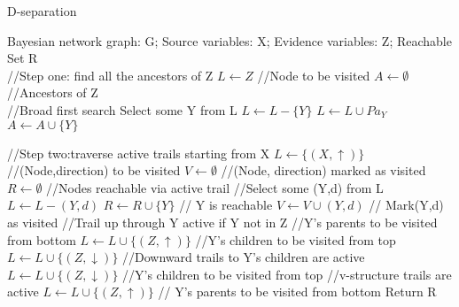 \documentclass[twoside]{article}
\begin{document}
\begin{algorithm}  
        \caption{D-separation}  
        \begin{algorithmic}[1]  
            \Require Bayesian network graph: G;  
            		 Source variables: X;   
            		 Evidence variables: Z; 
            \Ensure Reachable Set R  \\
            //Step one: find all the ancestors of Z
            \State $L \gets Z$  //Node to be visited
            \State $A \gets \emptyset$  //Ancestors of Z  \\
            //Broad first search
            	\State Select some Y from L
            	\State $L\gets L-\{Y\}$
            	 	\State $L\gets L \cup Pa_Y$
            	\EndIf
            	\State $A\gets A\cup \{Y\}$
            \EndWhile
            
            //Step two:traverse active trails starting from X
            \State $L\gets \{(X, \uparrow )\}$ //(Node,direction) to be visited
            \State $V\gets \emptyset$ //(Node, direction) marked as visited
            \State $R\gets \emptyset$ //Nodes reachable via active trail
            \While
            	//Select some (Y,d) from L
            	\State $L\gets L-{(Y,d)}$
            			\State $R\gets R\cup \{Y\}$ // Y is reachable
            		\EndIf
            		\State $V\gets V\cup {(Y,d)}$  // Mark(Y,d) as visited
            		 //Trail up through Y active if Y not in Z
            			//Y's parents to be visited from bottom
            			 	\State $L\gets L\cup \{(Z, \uparrow)\}$
            			\EndFor
            			//Y's children to be visited from top
            			 	\State $L\gets L\cup \{(Z, \downarrow)\}$
            			\EndFor
            			//Downward trails to Y's children are active
            					\State $L\gets L\cup \{(Z,\downarrow)\}$ //Y's children to be visited from top
            				\EndFor
            			\EndIf
            			  //v-structure trails are active
            					\State $L\gets L\cup \{(Z,\uparrow)\}$ // Y's parents to be visited from bottom
            				\EndFor
            			\EndIf
            		\EndIf
            	\EndIf
            \EndWhile
            \State Return R
        \end{algorithmic}  
    \end{algorithm}  
\end{document}
